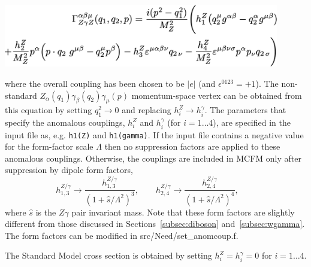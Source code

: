 \includegraphics[width=0.9\textwidth]{./sections/gobbets/ZZgamma.png}

where the overall coupling has been chosen to be $|e|$ (and
$\epsilon^{0123}=+1$). The non-standard $Z_\alpha(q_1) \gamma_\beta(q_2)
\gamma_\mu(p)$ momentum-space vertex can be obtained from
this equation by setting $q_1^2 \to 0$ and replacing $h_i^Z \to
h_i^\gamma$. 
The parameters that
specify the anomalous couplings, $h_i^Z$ and $h_i^\gamma$ (for $i=1\ldots 4$), are
specified in the input file as, e.g. {\tt h1(Z)} and {\tt h1(gamma)}.
If the input file contains a negative value for the form-factor scale $\Lambda$
then no suppression factors are applied to these anomalous couplings.
Otherwise, the couplings are included
in MCFM only after suppression by dipole form factors,
\begin{equation}
h_{1,3}^{Z/\gamma} \rightarrow
 \frac{h_{1,3}^{Z/\gamma}}{(1+\hat{s}/\Lambda^2)^3}, \qquad
h_{2,4}^{Z/\gamma} \rightarrow
 \frac{h_{2,4}^{Z/\gamma}}{(1+\hat{s}/\Lambda^2)^4}, \qquad
\end{equation}
where $\hat{s}$ is the $Z\gamma$ pair invariant mass. Note that these form factors are slightly
different from those discussed in Sections~\ref{subsec:diboson} and~\ref{subsec:wgamma}. The
form factors can be modified in {\ttfamily src/Need/set\_anomcoup.f}.

The Standard Model cross section is obtained by setting $h_i^Z = h_i^\gamma = 0$ for $i=1\ldots 4$.
